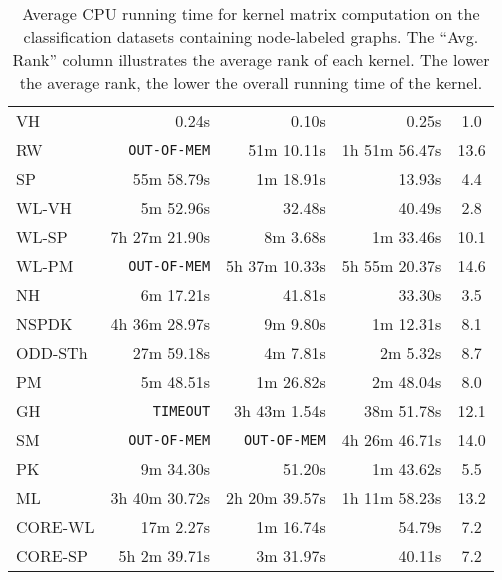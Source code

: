 \documentclass[twoside,11pt]{article}
\begin{document}
\begin{table}[t]
\begin{sc}
\begin{tabular}{lrrrm{1.48cm}}
& & & & \\ \hline
VH & 0.24s & 0.10s & 0.25s & \multicolumn{1}{c}{1.0} \\
RW & \texttt{OUT-OF-MEM} & 51m 10.11s & 1h 51m 56.47s & \multicolumn{1}{c}{13.6} \\
SP & 55m 58.79s & 1m 18.91s & 13.93s & \multicolumn{1}{c}{4.4} \\
WL-VH & 5m 52.96s & 32.48s & 40.49s & \multicolumn{1}{c}{2.8} \\
WL-SP & 7h 27m 21.90s & 8m 3.68s & 1m 33.46s & \multicolumn{1}{c}{10.1} \\
WL-PM & \texttt{OUT-OF-MEM} & 5h 37m 10.33s & 5h 55m 20.37s & \multicolumn{1}{c}{14.6} \\
NH & 6m 17.21s & 41.81s & 33.30s & \multicolumn{1}{c}{3.5} \\
NSPDK & 4h 36m 28.97s & 9m 9.80s & 1m 12.31s & \multicolumn{1}{c}{8.1} \\
ODD-STh & 27m 59.18s & 4m 7.81s & 2m 5.32s & \multicolumn{1}{c}{8.7} \\
PM & 5m 48.51s & 1m 26.82s & 2m 48.04s & \multicolumn{1}{c}{8.0} \\
GH & \texttt{TIMEOUT} & 3h 43m 1.54s & 38m 51.78s & \multicolumn{1}{c}{12.1} \\
SM & \texttt{OUT-OF-MEM} & \texttt{OUT-OF-MEM} & 4h 26m 46.71s & \multicolumn{1}{c}{14.0} \\
PK & 9m 34.30s & 51.20s & 1m 43.62s & \multicolumn{1}{c}{5.5} \\
ML & 3h 40m 30.72s & 2h 20m 39.57s & 1h 11m 58.23s & \multicolumn{1}{c}{13.2} \\
CORE-WL & 17m 2.27s & 1m 16.74s & 54.79s & \multicolumn{1}{c}{7.2} \\
CORE-SP & 5h 2m 39.71s & 3m 31.97s & 40.11s & \multicolumn{1}{c}{7.2} \\ \hline
\end{tabular}
\end{sc}
\caption{Average CPU running time for kernel matrix computation on the  classification datasets containing node-labeled graphs. The ``Avg. Rank'' column illustrates the average rank of each kernel. The lower the average rank, the lower the overall running time of the kernel.}
\label{tab:runtimes_labeled}
\end{table}
\end{document}
